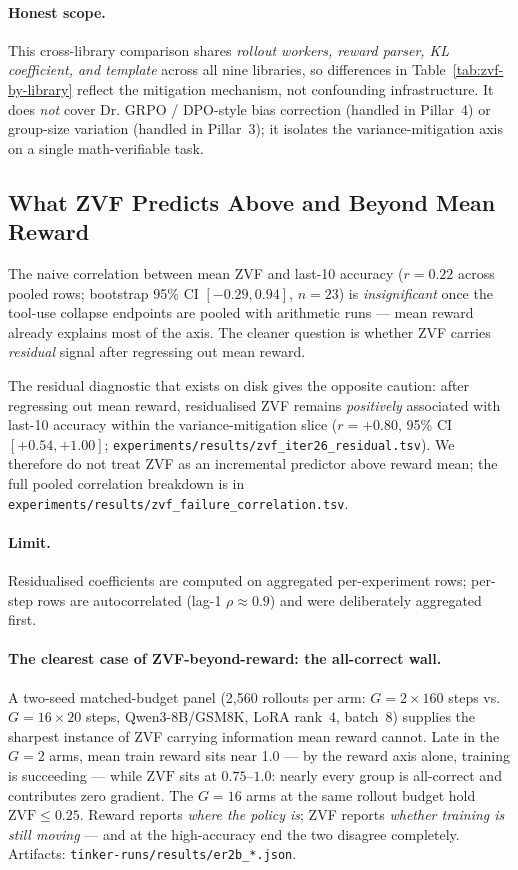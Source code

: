 \documentclass{article}
\begin{document}
\paragraph{Honest scope.}
This cross-library comparison shares \emph{rollout workers, reward
parser, KL coefficient, and template} across all nine libraries, so
differences in Table~\ref{tab:zvf-by-library} reflect the mitigation
mechanism, not confounding infrastructure. It does \emph{not} cover
Dr. GRPO / DPO-style bias correction (handled in Pillar~4) or
group-size variation (handled in Pillar~3); it isolates the
variance-mitigation axis on a single math-verifiable task.

\subsection{What ZVF Predicts Above and Beyond Mean Reward}
\label{sec:zvf-residualised}
The naive correlation between mean ZVF and last-10 accuracy
($r{=}0.22$ across pooled rows; bootstrap 95\% CI $[-0.29,0.94]$,
$n{=}23$) is \emph{insignificant} once the tool-use collapse endpoints
are pooled with arithmetic runs --- mean reward already explains most
of the axis. The cleaner question is whether ZVF carries
\emph{residual} signal after regressing out mean reward.

The residual diagnostic that exists on disk gives the opposite caution:
after regressing out mean reward, residualised ZVF remains \emph{positively}
associated with last-10 accuracy within the variance-mitigation slice
($r=+0.80$, 95\% CI $[+0.54,+1.00]$;
\texttt{experiments/results/zvf\_iter26\_residual.tsv}). We therefore do
not treat ZVF as an incremental predictor above reward mean; the full pooled
correlation breakdown is in \texttt{experiments/results/zvf\_failure\_correlation.tsv}.

\paragraph{Limit.} Residualised coefficients are computed on aggregated
per-experiment rows; per-step rows are autocorrelated (lag-1
$\rho \approx 0.9$) and were deliberately aggregated first.

\paragraph{The clearest case of ZVF-beyond-reward: the all-correct wall.}
A two-seed matched-budget panel (2{,}560 rollouts per arm:
$G{=}2\times160$ steps vs.\ $G{=}16\times20$ steps, Qwen3-8B/GSM8K,
LoRA rank~4, batch~8) supplies the sharpest instance of ZVF carrying
information mean reward cannot. Late in the $G{=}2$ arms, mean train
reward sits near 1.0 --- by the reward axis alone, training is
succeeding --- while $\mathrm{ZVF}$ sits at $0.75$--$1.0$: nearly every
group is all-correct and contributes zero gradient. The $G{=}16$ arms at
the same rollout budget hold $\mathrm{ZVF}\le0.25$. Reward reports
\emph{where the policy is}; ZVF reports \emph{whether training is still
moving} --- and at the high-accuracy end the two disagree completely.
Artifacts: \texttt{tinker-runs/results/er2b\_*.json}.
\end{document}
